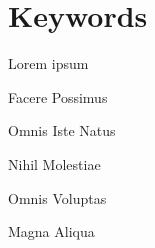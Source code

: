 \section*{Keywords}

{\large %

\noindent Lorem ipsum

\noindent Facere Possimus

\noindent Omnis Iste Natus

\noindent Nihil Molestiae

\noindent Omnis Voluptas

\noindent Magna Aliqua

}

\vfill

\cleardoublepage



\pagestyle{plain}



\def\contentsname{Índice}
\tableofcontents
\newpage

\listoffigures
\newpage

\listoftables

\cleardoublepage


